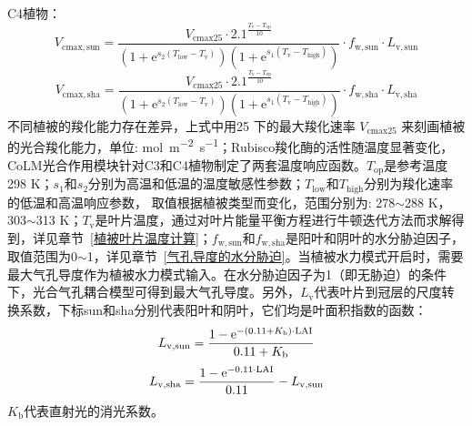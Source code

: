 C4植物：
\begin{equation}\label{V_cmaxsun_b}
V_{\mathrm{cmax,sun }}= \frac{V_{\mathrm{cmax 25}} \cdot 2.1^{\frac{T_{\mathrm{{v }}}-T_{\mathrm{o p}}}{10}}}{\left(1+{\mathrm e}^{s_{\mathrm{2}}\left(T_{\mathrm{{low }}}
 - T_{\mathrm{{v }}}\right)}\right)\left(1+{\mathrm e}^{s_{\mathrm{1}}\left(T_{\mathrm{{v }}}-T_{\mathrm{h i g h}}\right)}\right)} \cdot f_{\mathrm{w,sun}} \cdot L_{\mathrm{v,sun}}
\end{equation}
\begin{equation}\label{V_cmaxsha_b}
V_{\mathrm{cmax,sha }}= \frac{V_{\mathrm{cmax 25}} \cdot 2.1^{\frac{T_{\mathrm{{v }}}-T_{\mathrm{o p}}}{10}}}{\left(1+{\mathrm e}^{s_{\mathrm{2}}\left(T_{\mathrm{{low }}}
 - T_{\mathrm{{v }}}\right)}\right)\left(1+{\mathrm e}^{s_{\mathrm{1}}\left(T_{\mathrm{{v }}}-T_{\mathrm{h i g h}}\right)}\right)} \cdot f_{\mathrm{w,sha}} \cdot L_{\mathrm{v,sha}}
\end{equation}
不同植被的羧化能力存在差异，上式中用25 \textcelsius 下的最大羧化速率 $V_{\mathrm{cmax 25}}$ 来刻画植被的光合羧化能力，单位: \unit{mol.m^{-2}.s^{-1}}；Rubisco羧化酶的活性随温度显著变化，CoLM光合作用模块针对C3和C4植物制定了两套温度响应函数。$T_{\mathrm{op}}$是参考温度298 K；$s_1$和$s_2$分别为高温和低温的温度敏感性参数；$T_{\mathrm{low}}$和$T_{\mathrm{high}}$分别为羧化速率的低温和高温响应参数，
取值根据植被类型而变化，范围分别为: 278$\sim$288 K，303$\sim$313 K；$T_{\mathrm{v}}$是叶片温度，通过对叶片能量平衡方程进行牛顿迭代方法而求解得到，详见章节~\ref{植被叶片温度计算}；$f_{\mathrm{w,sun}}$和$f_{\mathrm{w,sha}}$是阳叶和阴叶的水分胁迫因子，取值范围为0$\sim$1，详见章节~\ref{气孔导度的水分胁迫}。当植被水力模式开启时，需要最大气孔导度作为植被水力模式输入。在水分胁迫因子为1（即无胁迫）的条件下，光合气孔耦合模型可得到最大气孔导度。另外，$L_{\mathrm v}$代表叶片到冠层的尺度转换系数，下标sun和sha分别代表阳叶和阴叶，它们均是叶面积指数的函数：
%
\begin{equation}\label{L_vsun}
L_{\mathrm{v,sun}}=\frac{1-{\mathrm e}^{-\left(0.11+K_{\mathrm{b}}\right) \cdot {\rm LAI}}}{0.11+K_{\mathrm{b}}}
\end{equation}
\begin{equation}\label{L_vsha}
L_{\mathrm{v,sha}}=\frac{1-{\mathrm e}^{-0.11\cdot {\rm LAI}}}{0.11} - L_{\mathrm{v,sun}}
\end{equation}
$K_{\mathrm{b}}$代表直射光的消光系数。

